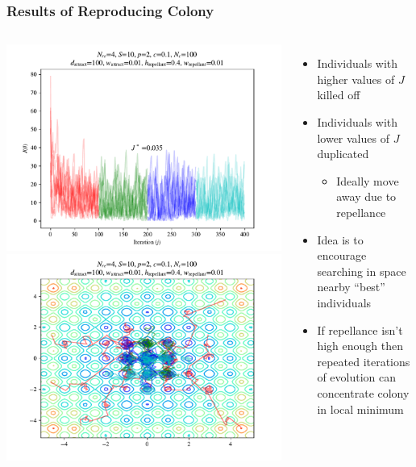 \documentclass{beamer}
\begin{document}
\begin{frame}
\frametitle{Results of Reproducing Colony}
\begin{columns}[T]
    \begin{center}
      \includegraphics[scale=0.3]{assets/rastrigin_colony_re_J}
      \includegraphics[scale=0.3]{assets/rastrigin_colony_re_theta}
    \end{center}
  \begin{itemize}
    \item<1-> Individuals with higher values of $J$ killed off
    \item<2-> Individuals with lower values of $J$ duplicated
    \begin{itemize}
      \item<2-> Ideally move away due to repellance
    \end{itemize}
    \item<3-> Idea is to encourage searching in space nearby ``best'' individuals
    \item<4-> If repellance isn't high enough then repeated iterations of evolution can concentrate colony in local minimum
  \end{itemize}
\end{columns}
\end{frame}
\end{document}
